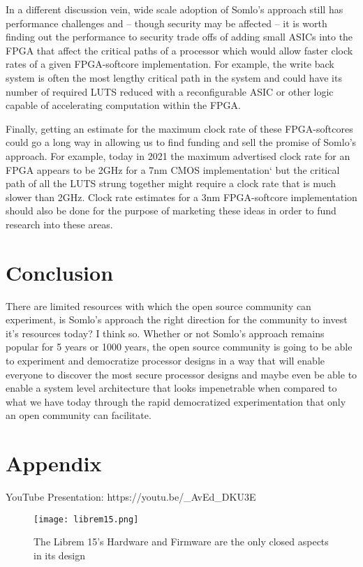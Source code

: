 \documentclass[conference]{IEEEtran}
\begin{document}
	In a different discussion vein, wide scale adoption of Somlo’s approach still has performance challenges and – though security may be affected – it is worth finding out the performance to security trade offs of adding small ASICs into the FPGA that affect the critical paths of a processor which would allow faster clock rates of a given FPGA-softcore implementation. For example, the write back system is often the most lengthy critical path in the system and could have its number of required LUTS reduced with a reconfigurable ASIC or other logic capable of accelerating computation within the FPGA.
	
	Finally, getting an estimate for the maximum clock rate of these FPGA-softcores could go a long way in allowing us to find funding and sell the promise of Somlo’s approach. For example, today in 2021 the maximum advertised clock rate for an FPGA appears to be 2GHz for a 7nm CMOS implementation`\cite{speedster} but the critical path of all the LUTS strung together might require a clock rate that is much slower than 2GHz. Clock rate estimates for a 3nm FPGA-softcore implementation should also be done for the purpose of marketing these ideas  in order to fund research into these areas.
	
	\section{Conclusion}
	
	There are limited resources with which the open source community can experiment, is Somlo’s approach the right direction for the community to invest it’s resources today? I think so. Whether or not Somlo’s approach remains popular for 5 years or 1000 years, the open source community is going to be able to experiment and democratize processor designs in a way that will enable everyone to discover the most secure processor designs and maybe even be able to enable a system level architecture that looks impenetrable when compared to what we have today through the rapid democratized experimentation that only an open community can facilitate.
	
	
	
	
	\section*{Appendix}
	
	YouTube Presentation:
	https://youtu.be/\_AvEd\_DKU3E
	
	\begin{figure*}
		\centering
		\texttt{[image: librem15.png]}
		\caption{The Librem 15's Hardware and Firmware are the only closed aspects in its design~\cite{bunnie}}
	\end{figure*}
	
\end{document}
